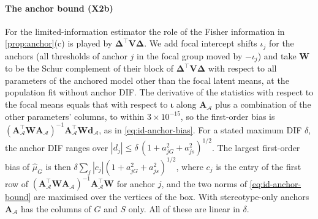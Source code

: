 \paragraph{The anchor bound (X2b)}
For the limited-information estimator the role of the Fisher information in \cref{prop:anchor}(c) is played by $\bm\Delta^\top\bm V\bm\Delta$. We add focal intercept shifts $\iota_j$ for the anchors (all thresholds of anchor $j$ in the focal group moved by $-\iota_j$) and take $\bm W$ to be the Schur complement of their block of $\bm\Delta^\top\bm V\bm\Delta$ with respect to all parameters of the anchored model other than the focal latent means, at the population fit without anchor DIF. The derivative of the statistics with respect to the focal means equals that with respect to $\bm\iota$ along $\bm A_{\mathcal A}$ plus a combination of the other parameters' columns, to within $3\times10^{-15}$, so the first-order bias is $(\bm A_{\mathcal A}^\top\bm W\bm A_{\mathcal A})^{-1}\bm A_{\mathcal A}^\top\bm W\bm d_{\mathcal A}$, as in \eqref{eq:id-anchor-bias}. For a stated maximum DIF $\delta$, the anchor DIF ranges over $|d_j|\le\delta\,(1+a_{jG}^2+a_{js}^2)^{1/2}$. The largest first-order bias of $\hat\mu_G$ is then $\delta\sum_j|c_j|(1+a_{jG}^2+a_{js}^2)^{1/2}$, where $c_j$ is the entry of the first row of $(\bm A_{\mathcal A}^\top\bm W\bm A_{\mathcal A})^{-1}\bm A_{\mathcal A}^\top\bm W$ for anchor $j$, and the two norms of \eqref{eq:id-anchor-bound} are maximised over the vertices of the box. With stereotype-only anchors $\bm A_{\mathcal A}$ has the columns of $G$ and $S$ only. All of these are linear in $\delta$.

